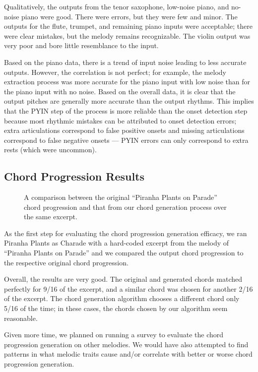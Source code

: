 Qualitatively, the outputs from the tenor saxophone, low-noise piano, and no-noise piano were good. There were errors, but they were few and minor. The outputs for the flute, trumpet, and remaining piano inputs were acceptable; there were clear mistakes, but the melody remains recognizable. The violin output was very poor and bore little resemblance to the input.

Based on the piano data, there is a trend of input noise leading to less accurate outputs. However, the correlation is not perfect; for example, the melody extraction process was more accurate for the piano input with low noise than for the piano input with no noise. Based on the overall data, it is clear that the output pitches are generally more accurate than the output rhythms. This implies that the PYIN step of the process is more reliable than the onset detection step because most rhythmic mistakes can be attributed to onset detection errors; extra articulations correspond to false positive onsets and missing articulations correspond to false negative onsets --- PYIN errors can only correspond to extra rests (which were uncommon).

\subsection{Chord Progression Results}
\label{sec:chord_progression_results}

\begin{figure}
    \resizebox{\linewidth}{!}{}
    \caption{A comparison between the original ``Piranha Plants on Parade'' chord progression and that from our chord generation process over the same excerpt.}
    \label{fig:chord_progression_pie}
\end{figure}
As the first step for evaluating the chord progression generation efficacy, we ran Piranha Plants as Charade with a hard-coded excerpt from the melody of ``Piranha Plants on Parade'' and we compared the output chord progression to the respective original chord progression.

Overall, the results are very good. The original and generated chords matched perfectly for 9/16 of the excerpt, and a similar chord was chosen for another 2/16 of the excerpt. The chord generation algorithm chooses a different chord only 5/16 of the time; in these cases, the chords chosen by our algorithm seem reasonable.

Given more time, we planned on running a survey to evaluate the chord progression generation on other melodies. We would have also attempted to find patterns in what melodic traits cause and/or correlate with better or worse chord progression generation.

